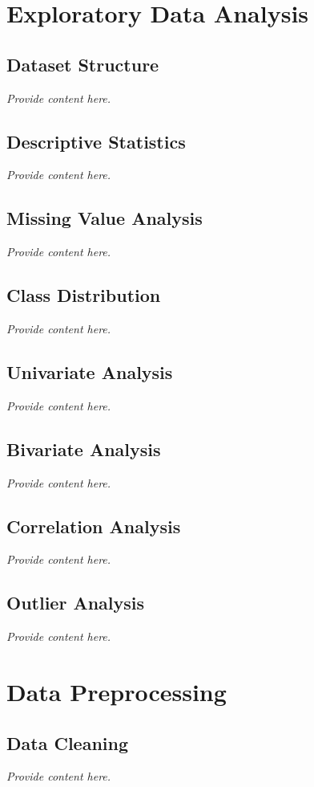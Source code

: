 \documentclass[12pt, a4paper]{article}
\begin{document}
\section{Exploratory Data Analysis}
\subsection{Dataset Structure}
\textit{Provide content here.}

\subsection{Descriptive Statistics}
\textit{Provide content here.}

\subsection{Missing Value Analysis}
\textit{Provide content here.}

\subsection{Class Distribution}
\textit{Provide content here.}

\subsection{Univariate Analysis}
\textit{Provide content here.}

\subsection{Bivariate Analysis}
\textit{Provide content here.}

\subsection{Correlation Analysis}
\textit{Provide content here.}

\subsection{Outlier Analysis}
\textit{Provide content here.}

\section{Data Preprocessing}
\subsection{Data Cleaning}
\textit{Provide content here.}
\end{document}
